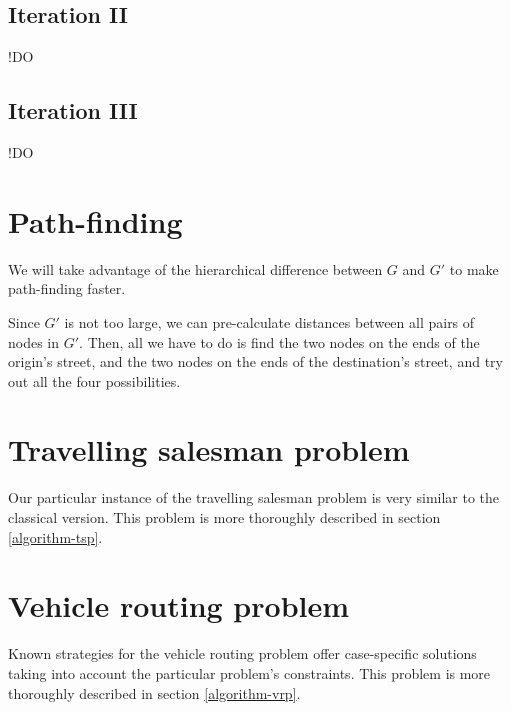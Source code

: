 \subsection{Iteration II}
!DO
\subsection{Iteration III}
!DO
\section{Path-finding} \label{problem-decomposition-pathfinding}
We will take advantage of the hierarchical difference between $G$ and $G'$ to make path-finding faster.\par
Since $G'$ is not too large, we can pre-calculate distances between all pairs of nodes in $G'$.
Then, all we have to do is find the two nodes on the ends of the origin's street, and the two nodes on the ends of the destination's street, and try out all the four possibilities.
\section{Travelling salesman problem} \label{problem-decomposition-tsp}
Our particular instance of the travelling salesman problem is very similar to the classical version. This problem is more thoroughly described in section \ref{algorithm-tsp}.
\section{Vehicle routing problem} \label{problem-decomposition-vrp}
Known strategies for the vehicle routing problem offer case-specific solutions taking into account the particular problem's constraints. This problem is more thoroughly described in section \ref{algorithm-vrp}.
